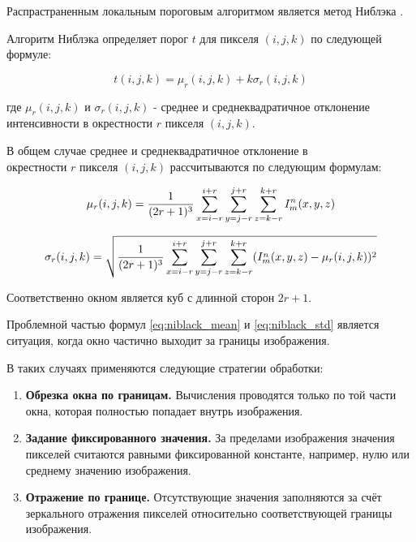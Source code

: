 Распрастраненным локальным пороговым алгоритмом является метод Ниблэка \cite{niblack1985introduction}.

Алгоритм Ниблэка определяет порог \(t\) для пикселя \((i, j, k)\) по следующей формуле:

\begin{equation} \label{eq:niblack}
    t(i, j, k) = \mu_r(i, j, k) + k \sigma_r(i, j, k)
\end{equation}

где \(\mu_r(i, j, k)\) и \(\sigma_r(i, j, k)\) - среднее и среднеквадратичное отклонение интенсивности в окрестности \(r\) пикселя \((i, j, k)\).

В общем случае среднее и среднеквадратичное отклонение в \\ окрестности \(r\) пикселя \((i, j, k)\) рассчитываются по следующим формулам:

\begin{equation}\label{eq:niblack_mean}
    \mu_r(i, j, k) = \frac{1}{(2r + 1)^3} \sum_{x = i - r}^{i + r} \sum_{y = j - r}^{j + r} \sum_{z = k - r}^{k + r} I^n_m(x, y, z)
\end{equation}

\begin{equation}\label{eq:niblack_std}
    \sigma_r(i, j, k) = \sqrt{\frac{1}{(2r + 1)^3} \sum_{x = i - r}^{i + r} \sum_{y = j - r}^{j + r} \sum_{z = k - r}^{k + r} (I^n_m(x, y, z) - \mu_r(i, j, k))^2}
\end{equation}

Соответственно окном является куб с длинной сторон \(2r + 1\). 

Проблемной частью формул \ref{eq:niblack_mean} и \ref{eq:niblack_std} является ситуация, когда окно частично выходит за границы изображения.

В таких случаях применяются следующие стратегии обработки:

\begin{enumerate}
    \item \textbf{Обрезка окна по границам.} Вычисления проводятся только по той части окна, которая полностью попадает внутрь изображения.
    
    \item \textbf{Задание фиксированного значения.} За пределами изображения значения пикселей считаются равными фиксированной константе, например, нулю или среднему значению изображения.
    
    \item \textbf{Отражение по границе.} Отсутствующие значения заполняются за счёт зеркального отражения пикселей относительно соответствующей границы изображения.
\end{enumerate}

